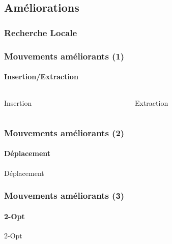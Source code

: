 \subsection{Améliorations}
\begin{frame}
	\frametitle{Recherche Locale}
\end{frame}
\begin{frame}
	\frametitle{Mouvements améliorants (1)}
	\framesubtitle{Insertion/Extraction}
	
	\begin{columns}
		\begin{column}{.5\linewidth}
			\begin{block}{Insertion}
				\centering
				\begin{tikzpicture}[scale=.7,schema,transform shape,thick]
					
				\end{tikzpicture}
			\end{block}
		\end{column}
		\begin{column}{.5\linewidth}
			\begin{block}{Extraction}
				\centering
				\begin{tikzpicture}[scale=.7,schema,transform shape,thick]
					
				\end{tikzpicture}
			\end{block}
		\end{column}
	\end{columns}
\end{frame}
\begin{frame}
	\frametitle{Mouvements améliorants (2)}
	\framesubtitle{Déplacement}
	\begin{block}{Déplacement}
		\centering
		\begin{tikzpicture}[scale=.7,schema,transform shape,thick]
			
		\end{tikzpicture}
	\end{block}
	
\end{frame}
\begin{frame}
	\frametitle{Mouvements améliorants (3)}
	\framesubtitle{2-Opt}
	\begin{block}{2-Opt}
		\centering
		\begin{tikzpicture}[scale=.7,schema,transform shape,thick]
			
		\end{tikzpicture}
	\end{block}
\end{frame}
